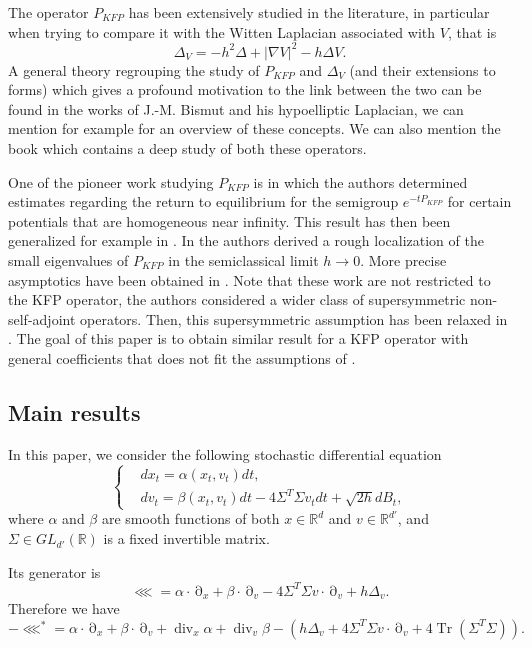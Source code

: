 \documentclass[12pt]{amsart}
\newcommand{\R}{\mathbb R}
\newcommand{\Tr}{{\operatorname{Tr}}}
\renewcommand{\div}{\operatorname{div}}
\numberwithin{equation}{section}
\numberwithin{figure}{section}
\DeclareMathOperator{\p}{\partial}
\begin{document}
The operator $P_{KFP}$ has been extensively studied in the literature, in particular when trying to compare it with the Witten Laplacian associated with $V$, that is
\begin{equation*}
\Delta_V = -h^2\Delta + |\nabla V|^2 - h\Delta V.
\end{equation*}
A general theory regrouping the study of $P_{KFP}$ and $\Delta_V$ (and their extensions to forms) which gives a profound motivation to the link between the two can be found in the works of J.-M. Bismut and his hypoelliptic Laplacian, we can mention for example \cite{Bi05,BiLe05} for an overview of these concepts. We can also mention the book \cite{HeNi06} which contains a deep study of both these operators.

One of the pioneer work studying $P_{KFP}$ is \cite{HeNi04} in which the authors determined estimates regarding the return to equilibrium for the semigroup $e^{-tP_{KFP}}$ for certain potentials that are homogeneous near infinity. This result has then been generalized for example in \cite{Li09,Be22}. In \cite{HeSjSt05} the authors derived a rough localization of the small eigenvalues of $P_{KFP}$ in the semiclassical limit $h\to0$. More precise asymptotics have been obtained in \cite{HeHiSj08-2,HeHiSj11_01}. Note that these work are not restricted to the KFP operator, the authors considered a wider class of supersymmetric non-self-adjoint operators. Then, this supersymmetric assumption has been relaxed in \cite{BoLePMi22}. The goal of this paper is to obtain similar result for a KFP operator with general coefficients that does not fit the assumptions of \cite{HeHiSj08-2,HeHiSj11_01,BoLePMi22}.


\subsection{Main results}
In this paper, we consider the following stochastic differential equation
\begin{equation}\label{eq:SDE}
\left\{
\begin{aligned}
&dx_t = \alpha(x_t,v_t)dt,\\
&dv_t = \beta(x_t,v_t)dt - 4\Sigma^T\Sigma v_tdt + \sqrt{2h}dB_t,
\end{aligned}
\right.
\end{equation}
where $\alpha$ and $\beta$ are smooth functions of both $x\in\R^d$ and $v\in\R^{d'}$, and $\Sigma\in GL_{d'}(\R)$ is a fixed invertible matrix.

Its generator is
\begin{equation*}
\lll = \alpha\cdot\p_x + \beta\cdot\p_v - 4\Sigma^T\Sigma v\cdot\p_v + h\Delta_v.
\end{equation*}
Therefore we have
\begin{equation*}
-\lll^* = \alpha\cdot\p_x + \beta\cdot\p_v + \div_x\alpha + \div_v\beta - (h\Delta_v + 4\Sigma^T\Sigma v\cdot\p_v + 4\Tr(\Sigma^T\Sigma)).
\end{equation*}
\end{document}
